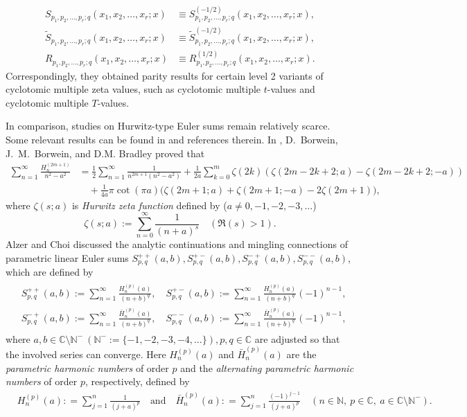 \documentclass[11pt]{article}
\def\N{\mathbb{N}}
\def\ze{\zeta}
\theoremstyle{plain}
\theoremstyle{definition}
\begin{document}
\begin{align*}
	S_{p_1,p_2,\ldots,p_r;q}(x_1,x_2,\ldots,x_r;x)&\equiv S^{(-1/2)}_{p_1,p_2,\ldots,p_r;q}(x_1,x_2,\ldots,x_r;x),\\
	\tilde{S}_{p_1,p_2,\ldots,p_r;q}(x_1,x_2,\ldots,x_r;x)&\equiv\tilde{S}^{(-1/2)}_{p_1,p_2,\ldots,p_r;q}(x_1,x_2,\ldots,x_r;x),\\
	R_{p_1,p_2,\ldots,p_r;q}(x_1,x_2,\ldots,x_r;x)&\equiv R^{(1/2)}_{p_1,p_2,\ldots,p_r;q}(x_1,x_2,\ldots,x_r;x).
\end{align*} Correspondingly, they obtained parity results for certain level 2 variants of cyclotomic multiple zeta values, such as cyclotomic multiple $t$-values and cyclotomic multiple $T$-values.

In comparison, studies on Hurwitz-type Euler sums remain relatively scarce. Some relevant results can be found in \cite{AC2020,BBD2008,XC2019} and references therein. In \cite{BBD2008}, D.~Borwein, J.~M.~Borwein, and D.M. Bradley proved that
\begin{align}\label{for-para-harm-num-hur-ze}
\sum\limits_{n=1}^{\infty}\frac{H_{n}^{(2m+1)}}{n^{2}-a^{2}}
&=\frac{1}{2}\sum\limits_{n=1}^{\infty}\frac{1}{n^{2m+1}(n^{2}-a^{2})}
+\frac{1}{2a}\sum\limits_{k=0}^{m}\zeta(2k)\left(\zeta(2m-2k+2;a)-\zeta(2m-2k+2;-a)\right)\nonumber\\
&\quad+\frac{1}{4a}\pi \cot(\pi a)\Big(\zeta(2m+1;a)+\zeta(2m+1;-a)-2\zeta(2m+1)\Big),
\end{align}
where $\ze(s;a)$ is \emph{Hurwitz zeta function} defined by ($a\neq 0,-1,-2,-3,\ldots$)
\[\ze(s;a):=\sum_{n=0}^\infty \frac{1}{(n+a)^s}\quad (\Re(s)>1).\]
Alzer and Choi \cite{AC2020} discussed the analytic continuations and mingling connections of parametric linear Euler sums
$S_{p,q}^{++}(a,b),S_{p,q}^{+-}(a,b),S_{p,q}^{-+}(a,b),S_{p,q}^{--}(a,b)$, which are defined by
\begin{align}\label{Defn-PLESs}
\begin{aligned}
&S_{p,q}^{++}(a,b):=\sum_{n=1}^\infty \frac{H_n^{(p)}(a)}{(n+b)^q},\quad S_{p,q}^{+-}(a,b):=\sum_{n=1}^\infty \frac{H_n^{(p)}(a)}{(n+b)^q}(-1)^{n-1},\\
&S_{p,q}^{-+}(a,b):=\sum_{n=1}^\infty \frac{{\bar H}_n^{(p)}(a)}{(n+b)^q},\quad S_{p,q}^{--}(a,b):=\sum_{n=1}^\infty \frac{{\bar H}_n^{(p)}(a)}{(n+b)^q}(-1)^{n-1},
\end{aligned}
\end{align}
where $a,b\in \mathbb{C}\setminus\N^-\ (\N^-:=\{-1,-2,-3,-4,\ldots\}), p,q\in \mathbb{C}$ are adjusted so that the involved series can converge. Here $H_n^{(p)}(a)$ and ${\bar H}_n^{(p)}(a)$ are the \emph{parametric harmonic numbers} of order $p$ and the \emph{alternating parametric harmonic numbers} of order $p$, respectively, defined by
\begin{align}
&H_n^{\left( p\right)}\left( a \right): = \sum\limits_{j = 1}^n {\frac{1}
{{{{\left( {j + a} \right)}^p}}}}\quad\text{and}\quad{\bar H}_n^{\left( p\right)}\left( a \right): = \sum\limits_{j = 1}^n {\frac{(-1)^{j-1}}
{{{{\left( {j + a} \right)}^p}}}}\quad (n\in \N,\ p\in \mathbb{C},\ a\in \mathbb{C}\setminus\N^-).\label{Defn-APHNSs}
\end{align}
\end{document}
